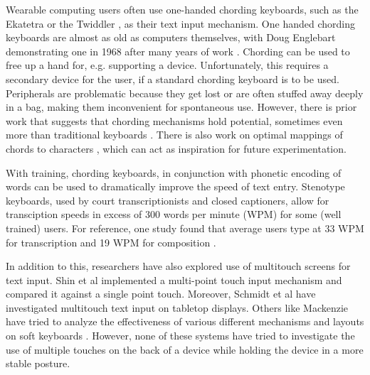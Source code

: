 Wearable computing users often use one-handed chording keyboards, such as the Ekatetra \cite{Ekatetra} or the Twiddler \cite{Twiddler}, as their text input mechanism. One handed chording keyboards are almost as old as computers themselves, with Doug Englebart demonstrating one in 1968 after many years of work \cite{Englebart}. Chording can be used to free up a hand for, e.g. supporting a device.  Unfortunately, this requires a secondary device for the user, if a standard chording keyboard is to be used.  Peripherals are problematic because they get lost or are often stuffed away deeply in a bag, making them inconvenient for spontaneous use. However, there is prior work that suggests that chording mechanisms hold potential, sometimes even more than traditional keyboards \cite{Conrad}. There is also work on optimal mappings of chords to characters \cite{Gopher}, which can act as inspiration for future experimentation. 

With training, chording keyboards, in conjunction with phonetic encoding of words can be used to dramatically improve the speed of text entry.  Stenotype keyboards, used by court transcriptionists and closed captioners, allow for transciption speeds in excess of 300 words per minute (WPM) for some (well trained) users.  For reference, one study found that average users type at 33 WPM for transcription and 19 WPM for composition \cite{Karat}.

In addition to this, researchers have also explored use of multitouch screens for text input. Shin et al \cite{Shin} implemented a multi-point touch input mechanism and compared it against a single point touch. Moreover, Schmidt et al \cite{Schmidt} have investigated multitouch text input on tabletop displays. Others like Mackenzie have tried to analyze the effectiveness of various different mechanisms and layouts on soft keyboards \cite{Mac}. However, none of these systems have tried to investigate the use of multiple touches on the back of a device while holding the device in a more stable posture.
